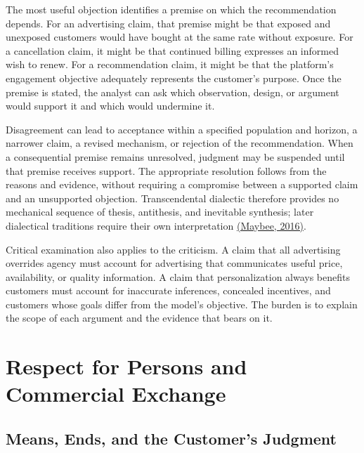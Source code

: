 The most useful objection identifies a premise on which the
recommendation depends. For an advertising claim, that premise might be
that exposed and unexposed customers would have bought at the same rate
without exposure. For a cancellation claim, it might be that continued
billing expresses an informed wish to renew. For a recommendation claim,
it might be that the platform's engagement objective adequately
represents the customer's purpose. Once the premise is stated, the
analyst can ask which observation, design, or argument would support it
and which would undermine it.

Disagreement can lead to acceptance within a specified population and
horizon, a narrower claim, a revised mechanism, or rejection of the
recommendation. When a consequential premise remains unresolved,
judgment may be suspended until that premise receives support. The
appropriate resolution follows from the reasons and evidence, without
requiring a compromise between a supported claim and an unsupported
objection. Transcendental dialectic therefore provides no mechanical
sequence of thesis, antithesis, and inevitable synthesis; later
dialectical traditions require their own interpretation
\href{https://plato.stanford.edu/entries/hegel-dialectics/}{(Maybee,
2016)}.

Critical examination also applies to the criticism. A claim that all
advertising overrides agency must account for advertising that
communicates useful price, availability, or quality information. A claim
that personalization always benefits customers must account for
inaccurate inferences, concealed incentives, and customers whose goals
differ from the model's objective. The burden is to explain the scope of
each argument and the evidence that bears on it.


\hypertarget{M09-respect-for-persons-and-commercial-exchange}{%
\section{Respect for Persons and Commercial
Exchange}\label{M09-respect-for-persons-and-commercial-exchange}}

\noindent \hypertarget{M09-means-ends-and-the-customers-judgment}{%
\subsection{Means, Ends, and the Customer's
Judgment}\label{M09-means-ends-and-the-customers-judgment}}


